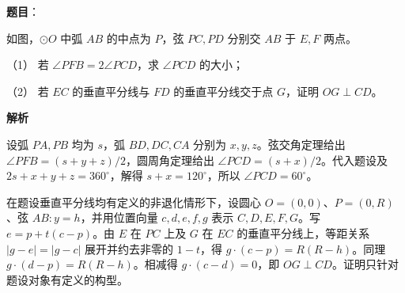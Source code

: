 \begin{answer}

\textbf{题目}：

如图，\(\odot O\) 中弧 \(AB\) 的中点为 \(P\)，弦 \(PC,PD\) 分别交 \(AB\) 于 \(E,F\) 两点。

（1） 若 \(\angle PFB=2\angle PCD\)，求 \(\angle PCD\) 的大小；

（2） 若 \(EC\) 的垂直平分线与 \(FD\) 的垂直平分线交于点 \(G\)，证明 \(OG\perp CD\)。
\nopagebreak[4]
\begin{center}\end{center}
\nopagebreak[4]
\textbf{解析}


设弧 \(PA,PB\) 均为 \(s\)，弧 \(BD,DC,CA\) 分别为 \(x,y,z\)。弦交角定理给出 \(\angle PFB=(s+y+z)/2\)，圆周角定理给出 \(\angle PCD=(s+x)/2\)。代入题设及 \(2s+x+y+z=360^\circ\)，解得 \(s+x=120^\circ\)，所以 \(\angle PCD=60^\circ\)。


在题设垂直平分线均有定义的非退化情形下，设圆心 \(O=(0,0)\)、\(P=(0,R)\)、弦 \(AB:y=h\)，并用位置向量 \(c,d,e,f,g\) 表示 \(C,D,E,F,G\)。写 \(e=p+t(c-p)\)。由 \(E\) 在 \(PC\) 上及 \(G\) 在 \(EC\) 的垂直平分线上，等距关系 \(|g-e|=|g-c|\) 展开并约去非零的 \(1-t\)，得 \(g\cdot(c-p)=R(R-h)\)。同理 \(g\cdot(d-p)=R(R-h)\)。相减得 \(g\cdot(c-d)=0\)，即 \(OG\perp CD\)。证明只针对题设对象有定义的构型。



\end{answer}
